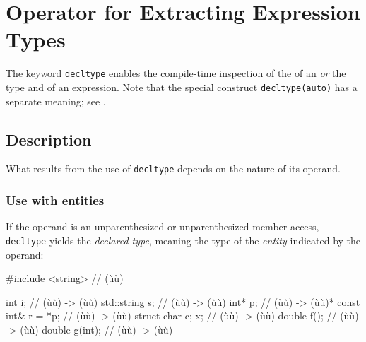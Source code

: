 \newpage
\section[\tt{decltype}]{Operator for Extracting Expression Types}\label{decltype}

The keyword \lstinline!decltype! enables the compile-time inspection of the  of an  \emph{or} the type and
 of an expression. Note that the special construct \lstinline!decltype(auto)! has a separate meaning; see .

\subsection[Description]{Description}\label{description}

What results from the use of \lstinline!decltype! depends on the nature of
its operand.

\subsubsection[Use with entities]{Use with entities}\label{use-with-(typically-named)-entities}

If the operand is an unparenthesized  or unparenthesized member access, \lstinline!decltype! yields the \emph{declared type}, meaning the type of the \emph{entity} indicated by the operand:


\begin{emcppshiddenlisting}[emcppsbatch=e1]
#include <string>  // (ù{}ù)
\end{emcppshiddenlisting}
\begin{emcppslisting}[emcppsbatch=e1]
int i;                // (ù{}ù)   -> (ù{}ù)
std::string s;        // (ù{}ù)   -> (ù{}ù)
int* p;               // (ù{}ù)   -> (ù{}ù)*
const int& r = *p;    // (ù{}ù)   -> (ù{}ù)
struct { char c; } x; // (ù{}ù) -> (ù{}ù)
double f();           // (ù{}ù)   -> (ù{}ù)
double g(int);        // (ù{}ù)   -> (ù{}ù)
\end{emcppslisting}



